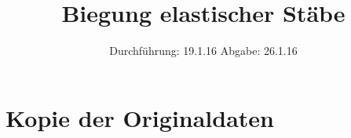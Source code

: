 

\subject{V 103}
\title{Biegung elastischer Stäbe}
\date{
  Durchführung: 19.1.16
  \hspace{3em}
  Abgabe: 26.1.16
}



\maketitle
\thispagestyle{empty}
\tableofcontents
\newpage






\printbibliography

\appendix
\section{Kopie der Originaldaten}


